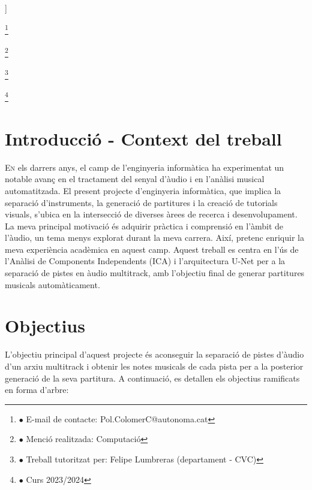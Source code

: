 \documentclass[10pt,a4paper,twocolumn,twoside]{article}
\newcommand\blfootnote[1]{%
  \begingroup
  \renewcommand\thefootnote{}\footnote{#1}%
  \addtocounter{footnote}{-1}%
  \endgroup
}
\begin{document}
\begin{@twocolumnfalse}
\begin{center}
\bigskip

{\vrule depth 0pt height 0.5pt width 4cm\hspace{7.5pt}%
%
\hspace{7.5pt}\vrule depth 0pt height 0.5pt width 4cm\relax}

\end{center}

\bigskip
\end{@twocolumnfalse}]

\blfootnote{$\bullet$ E-mail de contacte: Pol.ColomerC@autonoma.cat}
\blfootnote{$\bullet$ Menció realitzada: Computació}
\blfootnote{$\bullet$ Treball tutoritzat per: Felipe Lumbreras (departament - CVC)}
\blfootnote{$\bullet$ Curs 2023/2024}


\section{Introducció - Context del treball}
\label{sec:intro}

\lettrine[lines=3]{E}{n} els darrers anys, el camp de l'enginyeria informàtica ha experimentat un notable avanç en el tractament del senyal d'àudio i en l'anàlisi musical automatitzada. El present projecte d'enginyeria informàtica, que implica la separació d'instruments, la generació de partitures i la creació de tutorials visuals, s'ubica en la intersecció de diverses àrees de recerca i desenvolupament. La meva principal motivació és adquirir pràctica i comprensió en l'àmbit de l'àudio, un tema menys explorat durant la meva carrera. Així, pretenc enriquir la meva experiència acadèmica en aquest camp. Aquest treball es centra en l'ús de l'Anàlisi de Components Independents (ICA) i l'arquitectura U-Net per a la separació de pistes en àudio multitrack, amb l'objectiu final de generar partitures musicals automàticament.



\section{Objectius}
\label{sec:objectius}

L'objectiu principal d'aquest projecte és aconseguir la separació de pistes d'àudio d'un arxiu multitrack i obtenir les notes musicals de cada pista per a la posterior generació de la seva partitura. A continuació, es detallen els objectius ramificats en forma d'arbre:
\end{document}
